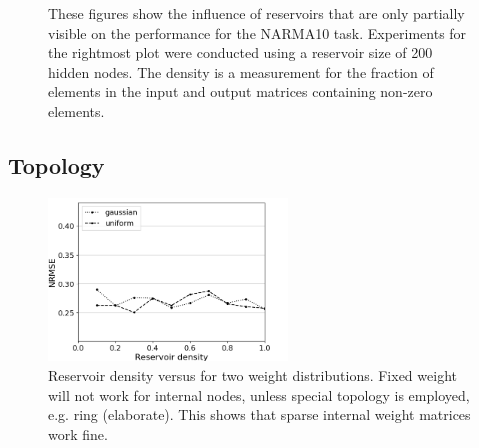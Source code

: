 \begin{figure}[htbp]
\begin{subfigure}{.3\textwidth}
  \end{subfigure}
  \caption{
    These figures show the influence of reservoirs that are only partially
visible on the performance for the NARMA10 task. Experiments for the rightmost
plot were conducted using a reservoir size of 200 hidden nodes. The density is a
measurement for the fraction of elements in the input and output matrices
containing non-zero elements.
  }
  \label{partial_visibility}
\end{figure}



\subsection{Topology}

\begin{figure}[H]
  \centering
  \includegraphics[width=2.5in]{img/reservoir_density_distrib.png}
  \caption{
    Reservoir density versus for two weight distributions. Fixed weight will not
work for internal nodes, unless special topology is employed, e.g. ring
(elaborate). This shows that sparse internal weight matrices work fine.
  }
  \label{reservoir_density_distrib}
\end{figure}


